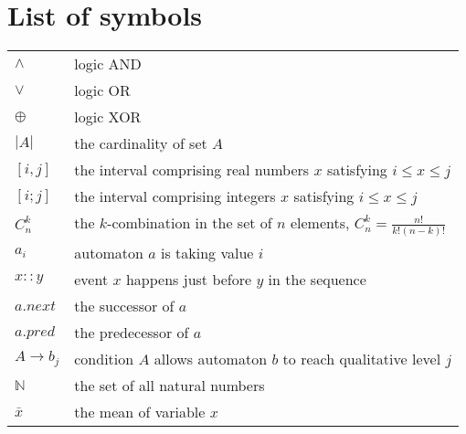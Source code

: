 \documentclass[11pt,twoside,openright]{report}
\theoremstyle{definition}
\newcommand{\roux}[2]{{\sout{#1}}{{\color{purple}~#2}}} %
\begin{document}
\begin{abstract}
Le chapitre~\ref{chap:modelInference} pr\'esente la m\'ethodologie de l'apprentissage par mod\`ele.
Nos syst\`emes de construction de mod\`eles par apprentissage %
 CRAC et M2RIT effectuent en fait une s\'election des mod\`eles.
Ils choisissent un mod\`ele parmi les candidats qui satisfont \`a toutes les contraintes d'accessibilit\'e donn\'ees.
Cependant, le nombre de mod\`eles candidats pouvant \^etre de tr\`es grande taille, %
 nos r\'eviseurs de mod\`eles peuvent r\'eduire l'espace de recherche avec des contraintes lors de la g\'en\'eration des mod\`eles.

Le chapitre~\ref{chap:test} pr\'esente quelques tests comparatifs et exploratoires et leurs r\'esultats sur les m\'ethodes pr\'esent\'ees aux chapitres~\ref{chap:refinement} et \ref{chap:modelInference}.
PermReach et ASPReach sont plus efficaces que les v\'erificateurs de mod\`ele traditionnels pour l'analyse de l'accessibilit\'e. Ils effectuent une analyse plus concluante tout en maintenant la dur\'ee de fonctionnement \`a la m\^eme \'echelle que les analyseurs statiques purs.

Le chapitre~\ref{chap:conclusion} conclut la th\`ese et propose des travaux futurs possibles.
\end{abstract}

\chapter*{List of symbols}
\begin{tabular}{l|l}
    $\land$ & logic AND\\
    $\lor$ & logic OR\\
    $\oplus$ & logic XOR\\
    $|A|$ & the cardinality of set $A$\\
    $[i,j]$& the interval comprising real numbers $x$ satisfying $i\leq x\leq j$\\
    $[i;j]$& the interval comprising integers $x$ satisfying $i\leq x\leq j$\\
    $C_n^k$& the $k$-combination in the set of $n$ elements, $C_n^k=\frac {n!}{k!(n-k)!}$\\
    $a_i$  & automaton $a$ is taking value $i$ \\
    $x::y$ & event $x$ happens just before $y$ in the sequence\\
    $a.next$&the successor of $a$\\
    $a.pred$ & the predecessor of $a$\\
    $A\to b_j$ & condition $A$ allows automaton $b$ to reach qualitative level $j$\\
    $\mathbb{N}$ & the set of all natural numbers\\
    $\bar{x}$ & the mean of variable $x$
\end{tabular}
\end{document}
